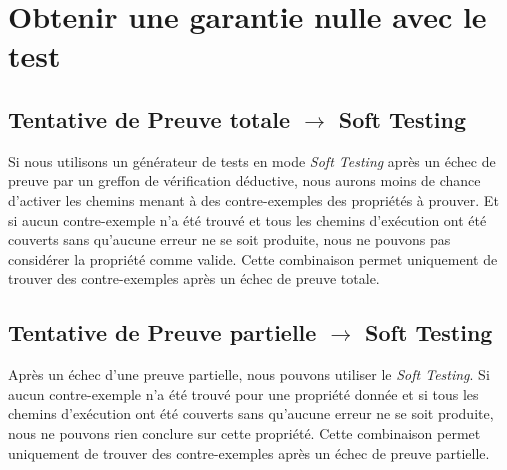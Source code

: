 \section{Obtenir une garantie nulle avec le test}

\subsection{Tentative de Preuve totale $\rightarrow$ Soft Testing}

Si nous utilisons un générateur de tests en mode {\em Soft Testing} après un
échec de preuve par un greffon de vérification déductive, nous aurons moins de
chance d'activer les chemins menant à des contre-exemples des propriétés à
prouver. Et si aucun contre-exemple n'a été trouvé et tous les chemins
d'exécution ont été couverts sans qu'aucune erreur ne se soit produite, nous
ne pouvons pas considérer la propriété comme valide. Cette combinaison permet
uniquement de trouver des contre-exemples après un échec de preuve totale.

\subsection{Tentative de Preuve partielle $\rightarrow$ Soft Testing}

Après un échec d'une preuve partielle, nous pouvons utiliser le {\em Soft
Testing}. Si aucun contre-exemple n'a été trouvé pour une propriété donnée et si
tous les chemins d'exécution ont été couverts sans qu'aucune erreur ne se soit
produite, nous ne pouvons rien conclure sur cette propriété.
Cette combinaison permet uniquement de trouver des contre-exemples après un
échec de preuve partielle.
